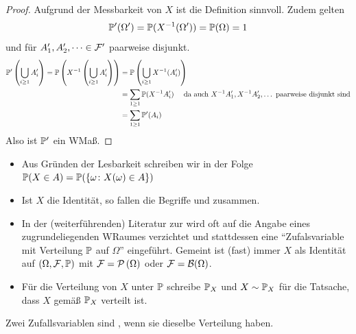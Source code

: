 \begin{proof}
    Aufgrund der Messbarkeit von $X$ ist die Definition sinnvoll. Zudem gelten
    \begin{equation*}
        \P'(\Omega') = \P(X^{-1}(\Omega')) = \P(\Omega) = 1
    \end{equation*}
    und für $A_1', A_2', \dots \in \ereignisF'$ paarweise disjunkt.
    \begin{equation*}
    \begin{aligned}
        \P' \left( \bigcup_{i \geq 1} A_i' \right) 
        = \P \left(X^{-1}\left( \bigcup_{i \geq 1} A_i' \right) \right) 
        &= \P \left( \bigcup_{i \geq 1} X^{-1}(A_i') \right) \\
        &= \sum_{1 \geq 1} \P(X^{-1} A_i') \quad \text{ da auch } X^{-1}A_1', X^{-1}A_2', \dots \text{ paarweise disjunkt sind} \\
        &= \sum_{1 \geq 1} \P'(A_i)
    \end{aligned}
    \end{equation*}
    Also ist $\P'$ ein WMaß.
\end{proof}

\begin{*bemerkung}
    \begin{itemize}[leftmargin=*, nolistsep]
        \item Aus Gründen der Lesbarkeit schreiben wir in der Folge $\P (X \in A) = \P ( \menge{\omega \colon X(\omega) \in A} )$
        \item Ist $X$ die Identität, so fallen die Begriffe \WMass und \WVerteilung zusammen.
        \item In der (weiterführenden) Literatur zur \WTheorie wird oft auf die Angabe eines zugrundeliegenden WRaumes verzichtet und stattdessen eine ``Zufalsvariable mit Verteilung $\P$ auf $\Omega$'' eingeführt.
        Gemeint ist (fast) immer $X$ als Identität auf $(\Omega, \ereignisF, \P)$ mit $\ereignisF = \pows\Omega$ oder $\ereignisF = \borel\Omega$.
        \item Für die Verteilung von $X$ unter $\P$ schreibe $\P_X$ und $X \sim \P_{X}$ für die Tatsache, dass $X$ gemäß $\P_X$ verteilt ist.
    \end{itemize}
\end{*bemerkung}

\begin{definition}
    Zwei Zufallsvariablen sind , wenn sie dieselbe Verteilung haben.
\end{definition}

